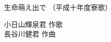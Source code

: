 \documentclass[10pt,b5j]{tarticle} %
\begin{document}
\begin{minipage}[c]{0.7\hsize} %
    \begin{center}
        {\LARGE
            生命萌え出で %
        }
        {\small 
            （平成十年度寮歌） %
        }
    \end{center}
\end{minipage}
\begin{minipage}[c]{0.3\hsize} %
    \begin{flushright} %
        小日山輝泉君 作歌\\長谷川健君 作曲 %
    \end{flushright}
\end{minipage}
\end{document}
